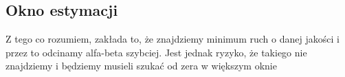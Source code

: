 \subsection{Okno estymacji}
\label{subsec:okno-estymacji}

{
    \color{red}
    \large Z tego co rozumiem, zakłada to, że znajdziemy minimum ruch o danej jakości i przez to odcinamy alfa-beta szybciej.
Jest jednak ryzyko, że takiego nie znajdziemy i będziemy musieli szukać od zera w większym oknie
}